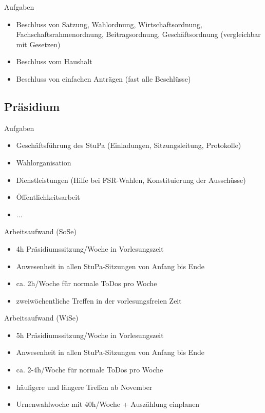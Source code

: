\documentclass{beamer}
\begin{document}
\begin{frame}{Aufgaben}
    \begin{itemize}
        \item Beschluss von Satzung, Wahlordnung, Wirtschaftsordnung,
              Fachschaftsrahmenordnung, Beitragsordnung, Geschäftsordnung
              (vergleichbar mit Gesetzen)
        \item Beschluss vom Haushalt
        \item Beschluss von einfachen Anträgen (fast alle Beschlüsse)
    \end{itemize}
\end{frame}

\subsection{Präsidium}
\begin{frame}{Aufgaben}
    \begin{itemize}
        \item Geschäftsführung des StuPa (Einladungen, Sitzungsleitung, Protokolle)
        \item Wahlorganisation
        \item Dienstleistungen (Hilfe bei FSR-Wahlen, Konstituierung der Ausschüsse)
        \item Öffentlichkeitsarbeit
        \item ...
    \end{itemize}
\end{frame}

\begin{frame}{Arbeitsaufwand (SoSe)}
    \begin{itemize}
        \item 4h Präsidiumssitzung/Woche in Vorlesungszeit
        \item Anwesenheit in allen StuPa-Sitzungen von Anfang bis Ende
        \item ca. 2h/Woche für normale ToDos pro Woche
        \item zweiwöchentliche Treffen in der vorlesungsfreien Zeit
    \end{itemize}
\end{frame}

\begin{frame}{Arbeitsaufwand (WiSe)}
    \begin{itemize}
        \item 5h Präsidiumssitzung/Woche in Vorlesungszeit
        \item Anwesenheit in allen StuPa-Sitzungen von Anfang bis Ende
        \item ca. 2-4h/Woche für normale ToDos pro Woche
        \item häufigere und längere Treffen ab November
        \item Urnenwahlwoche mit 40h/Woche + Auszählung einplanen
    \end{itemize}
\end{frame}
\end{document}
